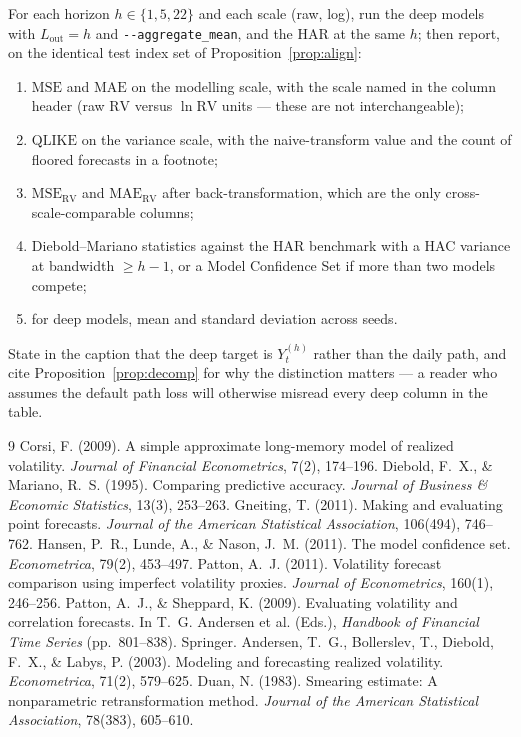 \documentclass[11pt,a4paper]{article}
\newcommand{\RV}{\mathrm{RV}}
\newcommand{\MSE}{\mathrm{MSE}}
\newcommand{\MAE}{\mathrm{MAE}}
\newcommand{\QLIKE}{\mathrm{QLIKE}}
\newcommand{\Lout}{L_{\mathrm{out}}}
\begin{document}
For each horizon $h\in\{1,5,22\}$ and each scale (raw, log), run the deep models with
$\Lout=h$ and \texttt{-{}-aggregate\_mean}, and the HAR at the same $h$; then report, on the
identical test index set of Proposition~\ref{prop:align}:
\begin{enumerate}
  \item $\MSE$ and $\MAE$ on the modelling scale, with the scale named in the column header
        (raw $\RV$ versus $\ln \RV$ units --- these are not interchangeable);
  \item $\QLIKE$ on the variance scale, with the naive-transform value and the count of
        floored forecasts in a footnote;
  \item $\MSE_{\RV}$ and $\MAE_{\RV}$ after back-transformation, which are the only
        cross-scale-comparable columns;
  \item Diebold--Mariano statistics against the HAR benchmark with a HAC variance at
        bandwidth $\ge h-1$, or a Model Confidence Set if more than two models compete;
  \item for deep models, mean and standard deviation across seeds.
\end{enumerate}
State in the caption that the deep target is $Y^{(h)}_t$ rather than the daily path, and
cite Proposition~\ref{prop:decomp} for why the distinction matters --- a reader who assumes
the default path loss will otherwise misread every deep column in the table.


\begin{thebibliography}{9}
 Corsi, F. (2009). A simple approximate long-memory model of realized volatility. \emph{Journal of Financial Econometrics}, 7(2), 174--196.
 Diebold, F.~X., \& Mariano, R.~S. (1995). Comparing predictive accuracy. \emph{Journal of Business \& Economic Statistics}, 13(3), 253--263.
 Gneiting, T. (2011). Making and evaluating point forecasts. \emph{Journal of the American Statistical Association}, 106(494), 746--762.
 Hansen, P.~R., Lunde, A., \& Nason, J.~M. (2011). The model confidence set. \emph{Econometrica}, 79(2), 453--497.
 Patton, A.~J. (2011). Volatility forecast comparison using imperfect volatility proxies. \emph{Journal of Econometrics}, 160(1), 246--256.
 Patton, A.~J., \& Sheppard, K. (2009). Evaluating volatility and correlation forecasts. In T.~G. Andersen et al. (Eds.), \emph{Handbook of Financial Time Series} (pp.~801--838). Springer.
 Andersen, T.~G., Bollerslev, T., Diebold, F.~X., \& Labys, P. (2003). Modeling and forecasting realized volatility. \emph{Econometrica}, 71(2), 579--625.
 Duan, N. (1983). Smearing estimate: A nonparametric retransformation method. \emph{Journal of the American Statistical Association}, 78(383), 605--610.
\end{thebibliography}
\end{document}
